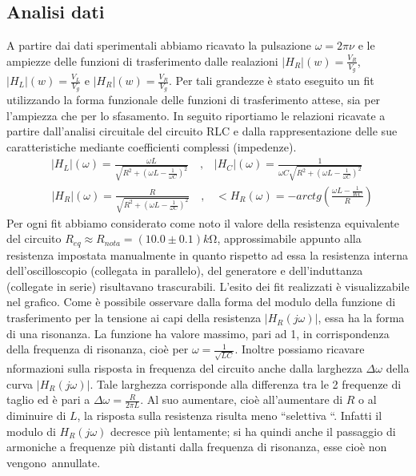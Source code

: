 \documentclass[a4paper]{article}
\begin{document}
\subsection{Analisi dati}
A partire dai dati sperimentali abbiamo ricavato la pulsazione $\omega = 2\pi \nu$ e le ampiezze delle funzioni di trasferimento dalle realazioni $|H_R|(w)= \frac{V_R}{V_g}$, $|H_L|(w)= \frac{V_L}{V_g}$ e $|H_R|(w)= \frac{V_R}{V_g}$. 
Per tali grandezze è stato eseguito un fit utilizzando la forma funzionale delle funzioni di trasferimento attese, sia per l'ampiezza che per lo sfasamento. In seguito riportiamo le relazioni ricavate a partire dall'analisi circuitale del circuito RLC e dalla rappresentazione delle sue caratteristiche mediante coefficienti complessi (impedenze).
\begin{align}
	 &|H_L|(\omega) = \frac{\omega L}{\sqrt{R^2 + (\omega L-\frac{1}{\omega C})^2}} \quad \text{,} \quad |H_C|(\omega) = \frac{1}{\omega C\sqrt{R^2 + (\omega L-\frac{1}{\omega C})^2}} \quad \label{eq:ampiezze VL, Vc RLC}
\end{align}
\begin{align}
	 &  |H_R|(\omega) = \frac{R}{\sqrt{R^2 + (\omega L-\frac{1}{\omega C})^2}}  \quad \text{,} \quad <H_R(\omega) = -arctg(\frac{\omega L -\frac{1}{WC}}{R}) \label{eq:Vr_RLC}
\end{align}
Per ogni fit abbiamo considerato come noto il valore della resistenza equivalente del circuito $R_{eq}\approx R_{nota} = (10.0\pm 0.1) k\si{\ohm}$, approssimabile appunto alla resistenza impostata manualmente in quanto rispetto ad essa la resistenza interna dell'oscilloscopio (collegata in parallelo), del generatore e dell'induttanza (collegate in serie) risultavano trascurabili. L'esito dei fit realizzati è visualizzabile nel grafico.
Come è possibile osservare dalla forma del modulo della funzione di trasferimento per la tensione ai capi della resistenza $|H_R(j\omega)|$, essa ha la forma di una risonanza. La funzione ha valore massimo, pari ad 1, in corrispondenza della frequenza di risonanza, cioè per $\omega = \frac{1}{\sqrt{LC}}$.
Inoltre possiamo ricavare nformazioni sulla risposta in frequenza del circuito anche dalla larghezza $\Delta \omega$ della curva $|H_R(j\omega)|$. Tale larghezza corrisponde alla differenza tra le 2 frequenze di taglio ed è pari a $\Delta \omega = \frac{R}{2\pi L}$. Al suo aumentare, cioè all'aumentare di $R$ o al diminuire di $L$, la risposta sulla resistenza risulta meno “selettiva “.
Infatti il modulo di $H_R(j\omega)$ decresce più lentamente; si ha quindi anche il passaggio di armoniche a frequenze più distanti dalla frequenza di risonanza, esse cioè non vengono annullate.
\end{document}
